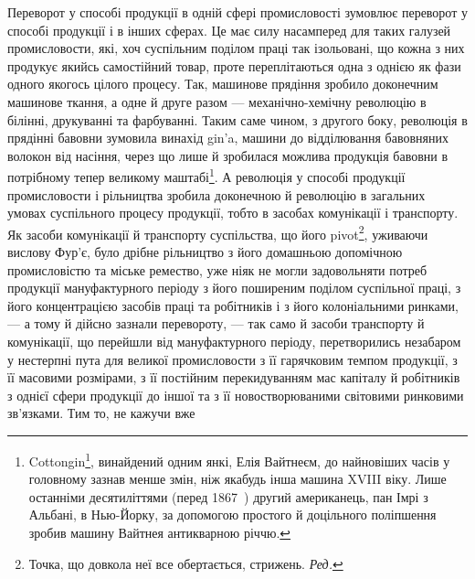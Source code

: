 Переворот у способі продукції в одній сфері промисловості
зумовлює переворот у способі продукції і в інших сферах. Це
має силу насамперед для таких галузей промисловости, які,
хоч суспільним поділом праці так ізольовані, що кожна з них
продукує якийсь самостійний товар, проте переплітаються одна
з однією як фази одного якогось цілого процесу. Так, машинове
прядіння зробило доконечним машинове ткання, а одне й друге
разом — механічно-хемічну революцію в білінні, друкуванні
та фарбуванні. Таким саме чином, з другого боку, революція в
прядінні бавовни зумовила винахід gin’a, машини до відділювання
бавовняних волокон від насіння, через що лише й зробилася
можлива продукція бавовни в потрібному тепер великому маштабі\footnote{
Cottongin\footnote*{
Машина, що вибирає зерно з бавовни. \emph{Ред.}
}, винайдений одним янкі, Елія Вайтнеєм, до найновіших
часів у головному зазнав менше змін, ніж якабудь інша машина XVIII віку.
Лише останніми десятиліттями (перед 1867~) другий американець, пан
Імрі з Альбані, в Нью-Йорку, за допомогою простого й доцільного
поліпшення зробив машину Вайтнея антикварною річчю.
}.
А революція у способі продукції промисловости і рільництва
зробила доконечною й революцію в загальних умовах суспільного
процесу продукції, тобто в засобах комунікації і транспорту.
Як засоби комунікації й транспорту суспільства, що його
pivot\footnote*{
Точка, що довкола неї все обертається, стрижень. \emph{Ред.}
}, уживаючи вислову Фур’є, було дрібне рільництво з його
домашньою допомічною промисловістю та міське ремество, уже
ніяк не могли задовольняти потреб продукції мануфактурного
періоду з його поширеним поділом суспільної праці, з його концентрацією
засобів праці та робітників і з його колоніальними
ринками, — а тому й дійсно зазнали перевороту, — так само й
засоби транспорту й комунікації, що перейшли від мануфактурного
періоду, перетворились незабаром у нестерпні пута для
великої промисловости з її гарячковим темпом продукції, з її масовими
розмірами, з її постійним перекидуванням мас капіталу й
робітників з однієї сфери продукції до іншої та з її новостворюваними
світовими ринковими зв’язками. Тим то, не кажучи вже
\parbreak{}  %

